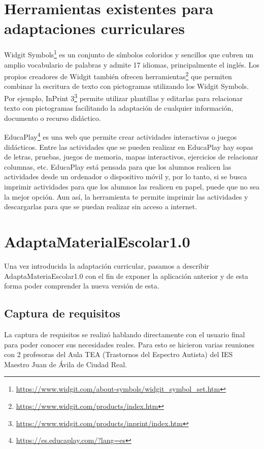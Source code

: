 \section{Herramientas existentes para adaptaciones curriculares}
Widgit Symbols\footnote{\url{https://www.widgit.com/about-symbols/widgit_symbol_set.htm}} es un conjunto de símbolos coloridos y sencillos que cubren un amplio vocabulario de palabras y admite 17 idiomas, principalmente el inglés. Los propios creadores de Widgit también ofrecen herramientas\footnote{\url{https://www.widgit.com/products/index.htm}} que permiten combinar la escritura de texto con pictogramas utilizando los Widgit Symbols. Por ejemplo, InPrint 3\footnote{\url{https://www.widgit.com/products/inprint/index.htm}} permite utilizar plantillas y editarlas para relacionar texto con pictogramas facilitando la adaptación de cualquier información, documento o recurso didáctico.

EducaPlay\footnote{\url{https://es.educaplay.com/?lang=es}} es una web que permite crear actividades interactivas o juegos didácticos. Entre las actividades que se pueden realizar en EducaPlay hay sopas de letras, pruebas, juegos de memoria, mapas interactivos, ejercicios de relacionar columnas, etc. EducaPlay está pensada para que los alumnos realicen las actividades desde un ordenador o dispositivo móvil y, por lo tanto, si se busca imprimir actividades para que los alumnos las realicen en papel, puede que no sea la mejor opción. Aun así, la herramienta te permite imprimir las actividades y descargarlas para que se puedan realizar sin acceso a internet.

\section{AdaptaMaterialEscolar1.0}

Una vez introducida la adaptación curricular, pasamos a describir AdaptaMateriaEscolar1.0 con el fin de exponer la aplicación anterior y de esta forma poder comprender la nueva versión de esta.


\subsection{Captura de requisitos}
La captura de requisitos se realizó hablando directamente con el usuario final para poder conocer sus necesidades reales. Para esto se hicieron varias reuniones con 2 profesoras del Aula TEA (Trastornos del Espectro Autista) del IES Maestro Juan de Ávila de Ciudad Real.

